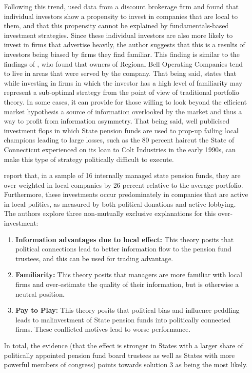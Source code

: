 Following this trend,  \cite{Zhu2002} used data from a discount brokerage firm and found that individual investors show a propensity to invest in companies that are local to them, and that this propensity cannot be explained by fundamentals-based investment strategies.  Since these individual investors are also more likely to invest in firms that advertise heavily, the author suggests that this is a results of investors being biased by firms they find familiar.  This finding is similar to the findings of \cite{Huberman2001}, who found that owners of Regional Bell Operating Companies tend to live in areas that were served by the company.  That being said, \cite{Monk2009} states that while investing in firms in which the investor has a high level of familiarity may represent a sub-optimal strategy from the point of view of traditional portfolio theory. In some cases, it can provide for those willing to look beyond the efficient market hypothesis a source of information overlooked by the market and thus a way to profit from information asymmetry. That being said, well publicised investment flops in which State pension funds are used to prop-up failing local champions leading to large losses, such as the 80 percent haircut the State of Connecticut experienced on its loan to Colt Industries in the early 1990s, can make this type of strategy politically difficult to execute. 
	
\cite{Bradley2016} report that, in a sample of 16 internally managed state pension funds, they are over-weighted in local companies by 26 percent relative to the average portfolio.  Furthermore, these investments occur predominately in companies that are active in local politics, as measured by both political donations and active lobbying.  The authors explore three non-mutually exclusive explanations for this over-investment: 
\begin{enumerate}
	\item \textbf{Information advantages due to local effect:}  This theory posits that political connections lead to better information flow to the pension fund trustees, and this can be used for trading advantage.
	\item  \textbf{Familiarity:}  This theory posits that managers are more familiar with local firms and over-estimate the quality of their information, but is otherwise a neutral position.
	\item \textbf{Pay to Play:}  This theory posits that political bias and influence peddling leads to malinvestment of State pension funds into politically connected firms.  These conflicted motives lead to worse performance. 
\end{enumerate}
In total, the evidence (that the effect is stronger in States with a larger share of politically appointed pension fund board trustees as well as States with more powerful members of congress) points towards solution 3 as being the most likely.  
	
